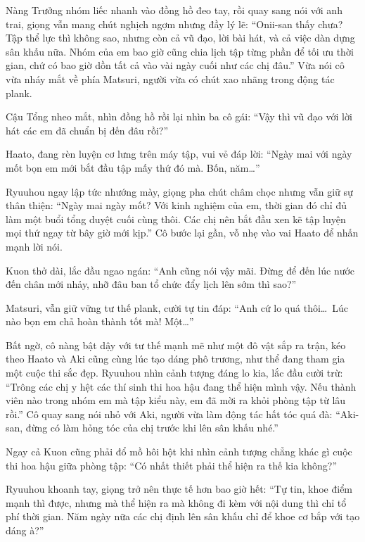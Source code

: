 \documentclass[../main.tex]{subfiles}
\begin{document}
Nàng Trưởng nhóm liếc nhanh vào đồng hồ đeo tay, rồi quay sang nói với anh trai, giọng vẫn mang chút nghịch ngợm nhưng đầy lý lẽ: ``Onii-san thấy chưa? Tập thể lực thì không sao, nhưng còn cả vũ đạo, lời bài hát, và cả việc dàn dựng sân khấu nữa. Nhóm của em bao giờ cũng chia lịch tập từng phần để tối ưu thời gian, chứ có bao giờ dồn tất cả vào vài ngày cuối như các chị đâu.'' Vừa nói cô vừa nháy mắt về phía Matsuri, người vừa có chút xao nhãng trong động tác plank.

Cậu Tổng nheo mắt, nhìn đồng hồ rồi lại nhìn ba cô gái: ``Vậy thì vũ đạo với lời hát các em đã chuẩn bị đến đâu rồi?''

Haato, đang rèn luyện cơ lưng trên máy tập, vui vẻ đáp lời: ``Ngày mai với ngày mốt bọn em mới bắt đầu tập mấy thứ đó mà. Bốn, năm\dots''

Ryuuhou ngay lập tức nhướng mày, giọng pha chút châm chọc nhưng vẫn giữ sự thân thiện: ``Ngày mai ngày mốt? Với kinh nghiệm của em, thời gian đó chỉ đủ làm một buổi tổng duyệt cuối cùng thôi. Các chị nên bắt đầu xen kẽ tập luyện mọi thứ ngay từ bây giờ mới kịp.'' Cô bước lại gần, vỗ nhẹ vào vai Haato để nhấn mạnh lời nói.

Kuon thở dài, lắc đầu ngao ngán: ``Anh cũng nói vậy mãi. Đừng để đến lúc nước đến chân mới nhảy, nhỡ đâu ban tổ chức đẩy lịch lên sớm thì sao?''

Matsuri, vẫn giữ vững tư thế plank, cười tự tin đáp: ``Anh cứ lo quá thôi\dots\ Lúc nào bọn em chả hoàn thành tốt mà! Một\dots''

Bất ngờ, cô nàng bật dậy với tư thế mạnh mẽ như một đô vật sắp ra trận, kéo theo Haato và Aki cũng cùng lúc tạo dáng phô trương, như thể đang tham gia một cuộc thi sắc đẹp. Ryuuhou nhìn cảnh tượng đáng lo kia, lắc đầu cười trừ: ``Trông các chị y hệt các thí sinh thi hoa hậu đang thể hiện mình vậy. Nếu thành viên nào trong nhóm em mà tập kiểu này, em đã mời ra khỏi phòng tập từ lâu rồi.'' Cô quay sang nói nhỏ với Aki, người vừa làm động tác hất tóc quá đà: ``Aki-san, đừng có làm hỏng tóc của chị trước khi lên sân khấu nhé.''

Ngay cả Kuon cũng phải đổ mồ hôi hột khi nhìn cảnh tượng chẳng khác gì cuộc thi hoa hậu giữa phòng tập: ``Có nhất thiết phải thể hiện ra thế kia không?''

Ryuuhou khoanh tay, giọng trở nên thực tế hơn bao giờ hết: ``Tự tin, khoe điểm mạnh thì được, nhưng mà thể hiện ra mà không đi kèm với nội dung thì chỉ tổ phí thời gian. Năm ngày nữa các chị định lên sân khấu chỉ để khoe cơ bắp với tạo dáng à?''
\end{document}
